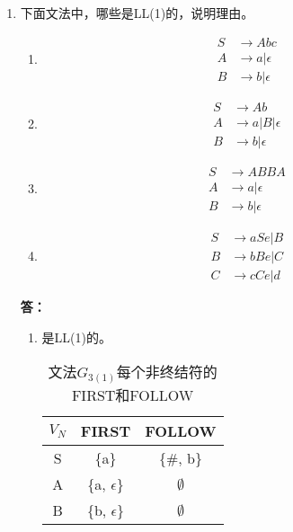 \begin{enumerate}[1.]
    
    \item 下面文法中，哪些是LL(1)的，说明理由。
    
        \begin{enumerate}[(1)]
            \item
            \begin{align*}
                S & \to Abc \\
                A & \to a | \epsilon \\
                B & \to b | \epsilon
            \end{align*}
            
            \item
            \begin{align*}
                S & \to Ab \\
                A & \to a | B | \epsilon \\
                B & \to b | \epsilon
            \end{align*}
            
            \item
            \begin{align*}
                S & \to ABBA \\
                A & \to a | \epsilon \\
                B & \to b | \epsilon
            \end{align*}
            
            \item
            \begin{align*}
                S & \to aSe | B \\
                B & \to bBe | C \\
                C & \to cCe | d
            \end{align*}
        \end{enumerate}
        
        \textbf{答：}
        
        \begin{enumerate}[(1)]
            \item 是LL(1)的。
            \begin{table}[H]
                \centering
                \begin{tabular}{|c|c|c|}
                    \hline
                    $V_N$ & FIRST & FOLLOW \\
                    \hline
                    S & \{a\} & \{\#, b\} \\
                    \hline
                    A & \{a, $\epsilon$\} & $\emptyset$ \\
                    \hline
                    B & \{b, $\epsilon$\} & $\emptyset$ \\
                    \hline
                \end{tabular}
                \caption{文法$G_{3(1)}$每个非终结符的FIRST和FOLLOW}
                \label{tab:G3_1FF}
            \end{table}
            

\end{enumerate}
\end{enumerate}
